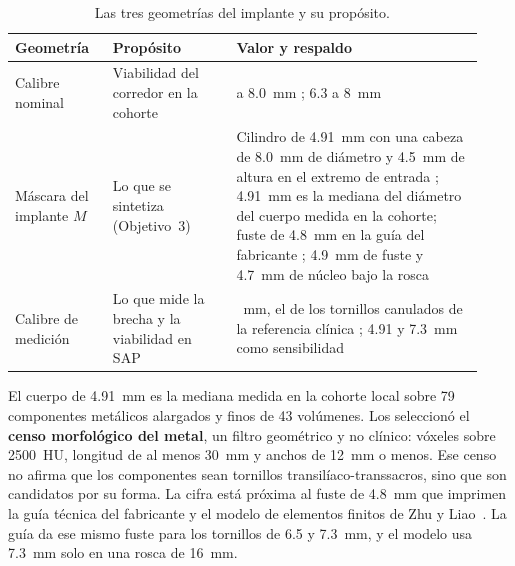 \begin{table}[htbp]
\centering
\small
\caption{Las tres geometrías del implante y su propósito.}
\label{tab:geometrias}
\setlength{\tabcolsep}{5pt}\renewcommand{\arraystretch}{1.1}
\begin{tabular}{>{\raggedright\arraybackslash}p{0.1988\linewidth} >{\raggedright\arraybackslash}p{0.2456\linewidth} >{\raggedright\arraybackslash}p{0.4843\linewidth}}
\hline
\textbf{Geometría} & \textbf{Propósito} & \textbf{Valor y respaldo} \\
\hline
Calibre nominal & Viabilidad del corredor en la cohorte & 6.5 a 8.0~mm \cite{gardner2010safezones}; 6.3 a 8~mm \cite{kaiser2014dysmorphism} \\
Máscara del implante $M$ & Lo que se sintetiza (Objetivo~3) & Cilindro de 4.91~mm con una cabeza de 8.0~mm de diámetro y 4.5~mm de altura en el extremo de entrada \cite{sayres2014comparison}; 4.91~mm es la mediana del diámetro del cuerpo medida en la cohorte; fuste de 4.8~mm en la guía del fabricante \cite{synthes2003guide}; 4.9~mm de fuste y 4.7~mm de núcleo bajo la rosca \cite{gardner2015screw} \\
Calibre de medición & Lo que mide la brecha y la viabilidad en SAP & 7.0~mm, el de los tornillos canulados de la referencia clínica \cite{zwingmann2009navigated}; 4.91 y 7.3~mm como sensibilidad \\
\hline
\end{tabular}
\end{table}

El cuerpo de 4.91~mm es la mediana medida en la cohorte local sobre 79 componentes metálicos alargados y finos de 43 volúmenes. Los seleccionó el \textbf{censo morfológico del metal}, un filtro geométrico y no clínico: vóxeles sobre 2500~HU, longitud de al menos 30~mm y anchos de 12~mm o menos. Ese censo no afirma que los componentes sean tornillos transilíaco-transsacros, sino que son candidatos por su forma. La cifra está próxima al fuste de 4.8~mm que imprimen la guía técnica del fabricante \cite{synthes2003guide} y el modelo de elementos finitos de Zhu y Liao~\cite{zhu2022optimalposition}. La guía da ese mismo fuste para los tornillos de 6.5 y 7.3~mm, y el modelo usa 7.3~mm solo en una rosca de 16~mm.

